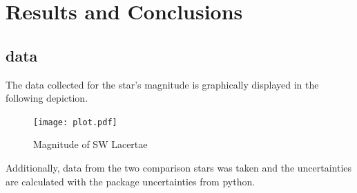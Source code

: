 \section{Results and Conclusions}
\label{sec:make}

\subsection{data}
  \label{sec:America}
  The data collected for the star's magnitude is graphically displayed in the following depiction.
  \begin{figure}[H]
    \centering
    \texttt{[image: plot.pdf]}
    \caption{Magnitude of SW Lacertae}
  \end{figure}
  Additionally, data from the two comparison stars was taken and 
  the uncertainties are calculated with the package uncertainties from python.

